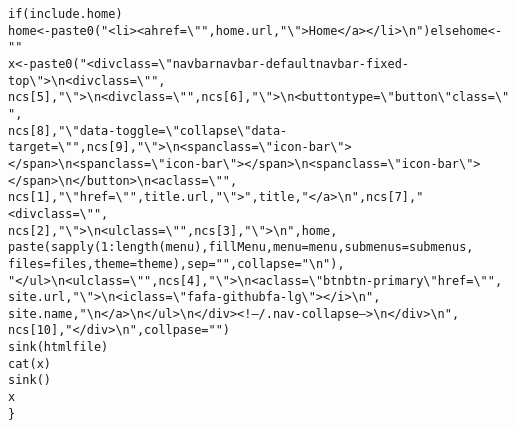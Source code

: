 \documentclass{article}\usepackage[]{graphicx}\usepackage[]{color}
\makeatletter
\newcommand{\hlnum}[1]{\textcolor[rgb]{0.863,0.196,0.184}{#1}}%
\newcommand{\hlstr}[1]{\textcolor[rgb]{0.863,0.196,0.184}{#1}}%
\newcommand{\hlopt}[1]{\textcolor[rgb]{0.576,0.631,0.631}{#1}}%
\newcommand{\hlstd}[1]{\textcolor[rgb]{0.514,0.58,0.588}{#1}}%
\newcommand{\hlkwa}[1]{\textcolor[rgb]{0.796,0.294,0.086}{#1}}%
\newcommand{\hlkwb}[1]{\textcolor[rgb]{0.522,0.6,0}{#1}}%
\newcommand{\hlkwc}[1]{\textcolor[rgb]{0.796,0.294,0.086}{#1}}%
\newcommand{\hlkwd}[1]{\textcolor[rgb]{0.576,0.631,0.631}{#1}}%
\newenvironment{kframe}{%
 \def\at@end@of@kframe{}%
 \ifinner\ifhmode%
  \def\at@end@of@kframe{\end{minipage}}%
  \begin{minipage}{\columnwidth}%
 \fi\fi%
 \def\FrameCommand##1{\hskip\@totalleftmargin \hskip-\fboxsep
 \colorbox{shadecolor}{##1}\hskip-\fboxsep
     \hskip-\linewidth \hskip-\@totalleftmargin \hskip\columnwidth}%
 \MakeFramed {\advance\hsize-\width
   \@totalleftmargin\z@ \linewidth\hsize
   \@setminipage}}%
 {\par\unskip\endMakeFramed%
 \at@end@of@kframe}
\newenvironment{knitrout}{}{} %
\makeatother
\begin{document}
\begin{knitrout}
\begin{kframe}
\begin{alltt}
    \hlkwa{if} \hlstd{(include.home)}
        \hlstd{home} \hlkwb{<-} \hlkwd{paste0}\hlstd{(}\hlstr{"<li><a href=\textbackslash{}""}\hlstd{, home.url,} \hlstr{"\textbackslash{}">Home</a></li>\textbackslash{}n          "}\hlstd{)} \hlkwa{else} \hlstd{home} \hlkwb{<-} \hlstr{""}
    \hlstd{x} \hlkwb{<-} \hlkwd{paste0}\hlstd{(}\hlstr{"<div class=\textbackslash{}"navbar navbar-default navbar-fixed-top\textbackslash{}">\textbackslash{}n  <div class=\textbackslash{}""}\hlstd{,}
        \hlstd{ncs[}\hlnum{5}\hlstd{],} \hlstr{"\textbackslash{}">\textbackslash{}n    <div class=\textbackslash{}""}\hlstd{, ncs[}\hlnum{6}\hlstd{],} \hlstr{"\textbackslash{}">\textbackslash{}n      <button type=\textbackslash{}"button\textbackslash{}" class=\textbackslash{}""}\hlstd{,}
        \hlstd{ncs[}\hlnum{8}\hlstd{],} \hlstr{"\textbackslash{}" data-toggle=\textbackslash{}"collapse\textbackslash{}" data-target=\textbackslash{}""}\hlstd{, ncs[}\hlnum{9}\hlstd{],} \hlstr{"\textbackslash{}">\textbackslash{}n        <span class=\textbackslash{}"icon-bar\textbackslash{}"></span>\textbackslash{}n        <span class=\textbackslash{}"icon-bar\textbackslash{}"></span>\textbackslash{}n        <span class=\textbackslash{}"icon-bar\textbackslash{}"></span>\textbackslash{}n      </button>\textbackslash{}n      <a class=\textbackslash{}""}\hlstd{,}
        \hlstd{ncs[}\hlnum{1}\hlstd{],} \hlstr{"\textbackslash{}" href=\textbackslash{}""}\hlstd{, title.url,} \hlstr{"\textbackslash{}">"}\hlstd{, title,} \hlstr{"</a>\textbackslash{}n"}\hlstd{, ncs[}\hlnum{7}\hlstd{],} \hlstr{"      <div class=\textbackslash{}""}\hlstd{,}
        \hlstd{ncs[}\hlnum{2}\hlstd{],} \hlstr{"\textbackslash{}">\textbackslash{}n        <ul class=\textbackslash{}""}\hlstd{, ncs[}\hlnum{3}\hlstd{],} \hlstr{"\textbackslash{}">\textbackslash{}n          "}\hlstd{, home,}
        \hlkwd{paste}\hlstd{(}\hlkwd{sapply}\hlstd{(}\hlnum{1}\hlopt{:}\hlkwd{length}\hlstd{(menu), fillMenu,} \hlkwc{menu} \hlstd{= menu,} \hlkwc{submenus} \hlstd{= submenus,}
            \hlkwc{files} \hlstd{= files,} \hlkwc{theme} \hlstd{= theme),} \hlkwc{sep} \hlstd{=} \hlstr{""}\hlstd{,} \hlkwc{collapse} \hlstd{=} \hlstr{"\textbackslash{}n          "}\hlstd{),}
        \hlstr{"        </ul>\textbackslash{}n        <ul class=\textbackslash{}""}\hlstd{, ncs[}\hlnum{4}\hlstd{],} \hlstr{"\textbackslash{}">\textbackslash{}n          <a class=\textbackslash{}"btn btn-primary\textbackslash{}" href=\textbackslash{}""}\hlstd{,}
        \hlstd{site.url,} \hlstr{"\textbackslash{}">\textbackslash{}n            <i class=\textbackslash{}"fa fa-github fa-lg\textbackslash{}"></i>\textbackslash{}n            "}\hlstd{,}
        \hlstd{site.name,} \hlstr{"\textbackslash{}n          </a>\textbackslash{}n        </ul>\textbackslash{}n      </div><!--/.nav-collapse -->\textbackslash{}n    </div>\textbackslash{}n  "}\hlstd{,}
        \hlstd{ncs[}\hlnum{10}\hlstd{],} \hlstr{"</div>\textbackslash{}n"}\hlstd{,} \hlkwc{collpase} \hlstd{=} \hlstr{""}\hlstd{)}
    \hlkwd{sink}\hlstd{(htmlfile)}
    \hlkwd{cat}\hlstd{(x)}
    \hlkwd{sink}\hlstd{()}
    \hlstd{x}
\hlstd{\}}
\end{alltt}
\end{kframe}
\end{knitrout}
\end{document}
